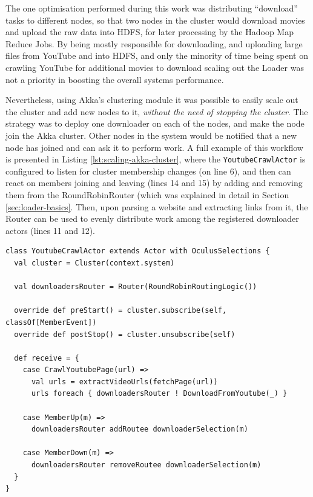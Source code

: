 The one optimisation performed during this work was distributing ``download'' tasks to different nodes, so that two nodes in the cluster would download movies and upload the raw data into HDFS, for later processing by the Hadoop Map Reduce Jobs. By being mostly responsible for downloading, and uploading large files from YouTube and into HDFS, and only the minority of time being spent on crawling YouTube for additional movies to download scaling out the Loader was not a priority in boosting the overall systems performance.

Nevertheless, using Akka's clustering module it was possible to easily scale out the cluster and add new nodes to it, \textit{without the need of stopping the cluster}. The strategy was to deploy one downloader on each of the nodes, and make the node join the Akka cluster. Other nodes in the system would be notified that a new node has joined and can ask it to perform work. A full example of this workflow is presented in Listing \ref{lst:scaling-akka-cluster}, where the \verb|YoutubeCrawlActor| is configured to listen for cluster membership changes (on line 6), and then can react on members joining and leaving (lines 14 and 15) by adding and removing them from the RoundRobinRouter (which was explained in detail in Section \ref{sec:loader-basics}. Then, upon parsing a website and extracting links from it, the Router can be used to evenly distribute work among the registered downloader actors (lines 11 and 12).


\begin{lstlisting}[caption={Listening for Cluster events in Akka allows the application to dynamically respond to nodes being added to the cluster, and spreading the load in application logic to other nodes.}, label={lst:scaling-akka-cluster}]
class YoutubeCrawlActor extends Actor with OculusSelections {
  val cluster = Cluster(context.system)

  val downloadersRouter = Router(RoundRobinRoutingLogic())

  override def preStart() = cluster.subscribe(self, classOf[MemberEvent])
  override def postStop() = cluster.unsubscribe(self)

  def receive = {
    case CrawlYoutubePage(url) =>
      val urls = extractVideoUrls(fetchPage(url))
      urls foreach { downloadersRouter ! DownloadFromYoutube(_) }

    case MemberUp(m) => 
      downloadersRouter addRoutee downloaderSelection(m)
    
    case MemberDown(m) => 
      downloadersRouter removeRoutee downloaderSelection(m)
  }
}
\end{lstlisting}

